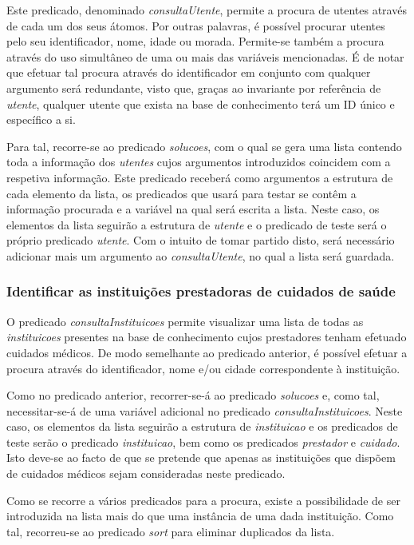 \documentclass[a4paper]{article}
\begin{document}
\hspace{3mm} Este predicado, denominado \textit{consultaUtente}, permite a procura de utentes através de cada um dos seus átomos. Por outras palavras, é possível procurar utentes pelo seu identificador, nome, idade ou morada. Permite-se também a procura através do uso simultâneo de uma ou mais das variáveis mencionadas. É de notar que efetuar tal procura através do identificador em conjunto com qualquer argumento será redundante, visto que, graças ao invariante por referência de \textit{utente}, qualquer utente que exista na base de conhecimento terá um ID único e específico a si.

\par Para tal, recorre-se ao predicado \textit{solucoes}, com o qual se gera uma lista contendo toda a informação dos \textit{utentes} cujos argumentos introduzidos coincidem com a respetiva informação. Este predicado receberá como argumentos a estrutura de cada elemento da lista, os predicados que usará para testar se contêm a informação procurada e a variável na qual será escrita a lista. Neste caso, os elementos da lista seguirão a estrutura de \textit{utente} e o predicado de teste será o próprio predicado \textit{utente}. Com o intuito de tomar partido disto, será necessário adicionar mais um argumento ao \textit{consultaUtente}, no qual a lista será guardada.

\subsubsection{Identificar as instituições prestadoras de cuidados de saúde}

\hspace{3mm} O predicado \textit{consultaInstituicoes} permite visualizar uma lista de todas as \textit{instituicoes} presentes na base de conhecimento cujos prestadores tenham efetuado cuidados médicos. De modo semelhante ao predicado anterior, é possível efetuar a procura através do identificador, nome e/ou cidade correspondente à instituição.
\par Como no predicado anterior, recorrer-se-á ao predicado \textit{solucoes} e, como tal, necessitar-se-á de uma variável adicional no predicado \textit{consultaInstituicoes}. Neste caso, os elementos da lista seguirão a estrutura de \textit{instituicao} e os predicados de teste serão o predicado \textit{instituicao}, bem como os predicados \textit{prestador} e \textit{cuidado}. Isto deve-se ao facto de que se pretende que apenas as instituições que dispõem de cuidados médicos sejam consideradas neste predicado.
\par Como se recorre a vários predicados para a procura, existe a possibilidade de ser introduzida na lista mais do que uma instância de uma dada instituição. Como tal, recorreu-se ao predicado \textit{sort} para eliminar duplicados da lista.
\end{document}
